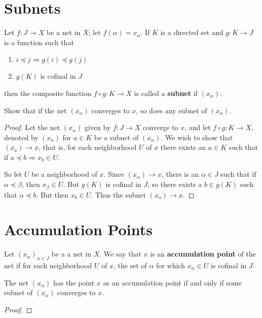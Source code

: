 \documentclass[12pt]{article}
\begin{document}
\section{Subnets}
\begin{defn}
    Let $f: J \to X$ be a net in $X$; let $f(\alpha) = x_\alpha$. If $K$ is a directed set and $g:
        K \to J$ is a function such that
    \begin{enumerate}
        \item $i \preceq j \Rightarrow g(i) \preceq g(j)$
        \item $g(K)$ is cofinal in $J$
    \end{enumerate}
    then the composite function $f \circ g : K \to X$ is called a \textbf{subnet} if $(x_\alpha)$.
\end{defn}

Show that if the net $(x_\alpha)$ converges to $x$, so does any subnet of $(x_\alpha)$.
\begin{proof}
    Let the net $(x_\alpha)$ given by $f: J \to X$ converge to $x$, and let $f \circ g : K \to X$,
    denoted by $(x_a)$ for $a \in K$ be a subnet of $(x_\alpha)$. We wish to show that
    $(x_a) \to x$, that is, for each neighborhood $U$ of $x$ there exists an $a \in K$ such that if
    $a \preceq b \Rightarrow x_b \in U$.

    So let $U$ be a neighborhood of $x$. Since $(x_\alpha) \to x$, there is an $\alpha \in J$ such
    that if $\alpha \preceq \beta$, then $x_\beta \in U$. But $g(K)$ is cofinal in $J$, so there
    exists a $b \in g(K)$ such that $\alpha \preceq b$. But then $x_b \in U$. Thus the subnet
    $(x_a) \to x$.
\end{proof}

\section{Accumulation Points}
\begin{defn}
    Let ${(x_\alpha)}_{\alpha\in J}$ be a a net in $X$. We say that $x$ is an \textbf{accumulation
        point} of the net if for each neighborhood $U$ of $x$, the set of $\alpha$ for which
    $x_\alpha \in U$ is cofinal in $J$.
\end{defn}

\begin{lemma}
    The net $(x_\alpha)$ has the point $x$ as an accumulation point if and only if some subnet of
    $(x_\alpha)$ converges to $x$.
\end{lemma}
\begin{proof}
\end{proof}
\end{document}
